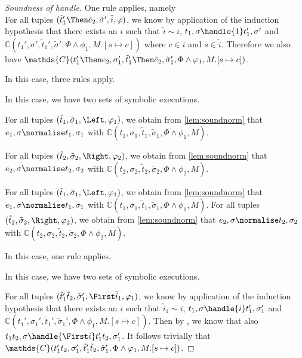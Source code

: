 \begin{proof}[Soundness of handle]
{One rule applies, namely \\
For all tuples $(\tilde{t}_1'\Then\tilde{e}_2,\tilde{\sigma}',\tilde{i},\phi)$, we know by application of the induction hypothesis that
there exists an $i$ such that $\tilde{i}\sim i$, $t_1,\sigma\handle{1}t_1',\sigma'$ and
$\mathds{C}(t_1',\sigma',\tilde{t}_1',\tilde{\sigma}',\Phi\land\phi_1,M.[s\mapsto c])$ where $c\in i$ and $s\in \tilde{i}$.
Therefore we also have $\mathds{C}(t_1'\Then e_2,\sigma_1',\tilde{t}_1'\Then \tilde{e}_2,\tilde{\sigma}_1',\Phi\land\phi_1,M.[s\mapsto c])$.
}

 {
In this case, three rules apply.\\
   {
   In this case, we have two sets of symbolic executions.

   For all tuples $(\tilde{t}_1,\tilde{\sigma}_1,\Left,\phi_1)$,
   we obtain from \cref{lem:soundnorm} that $e_1,\sigma\normalise t_1,\sigma_1$ with
   $\mathds{C}(t_1,\sigma_1,\tilde{t}_1,\tilde{\sigma}_1,\Phi\land\phi_1,M)$.

   For all tuples $(\tilde{t}_2,\tilde{\sigma}_2,\Right,\phi_2)$,
   we obtain from \cref{lem:soundnorm} that $e_2,\sigma\normalise t_2,\sigma_2$ with
   $\mathds{C}(t_2,\sigma_2,\tilde{t}_2,\tilde{\sigma}_2,\Phi\land\phi_2,M)$.
   }
%
  {
  For all tuples $(\tilde{t}_1,\tilde{\sigma}_1,\Left,\phi_1)$,
  we obtain from \cref{lem:soundnorm} that $e_1,\sigma\normalise t_1,\sigma_1$ with
  $\mathds{C}(t_1,\sigma_1,\tilde{t}_1,\tilde{\sigma}_1,\Phi\land\phi_1,M)$.
%
}
  {
  For all tuples $(\tilde{t}_2,\tilde{\sigma}_2,\Right,\phi_2)$,
  we obtain from \cref{lem:soundnorm} that $e_2,\sigma\normalise t_2,\sigma_2$ with
  $\mathds{C}(t_2,\sigma_2,\tilde{t}_2,\tilde{\sigma}_2,\Phi\land\phi_2,M)$.
  }
 }
%
{
In this case, one rule applies. 

In this case, we have two sets of symbolic executions.

  For all tuples $(\tilde{t}_1'\And\tilde{t}_2,\tilde{\sigma}_1',\First \tilde{i}_1,\phi_1)$,
  we know by application of the induction hypothesis that there exists an $i$ such that
  $\tilde{i}_1\sim i$, $t_1,\sigma\handle{i}t_1',\sigma_1'$ and
  $\mathds{C}(t_1',\sigma_1',\tilde{t}_1',\tilde{\sigma}_1',\Phi\land\phi_1,M.[s\mapsto c])$.
  Then by , we know that also $t_1\And t_2,\sigma\handle{\First i}t_1'\And t_2,\sigma_1'$.
  It follows trivially that $\mathds{C}(t_1'\And t_2,\sigma_1',\tilde{t}_1'\And \tilde{t}_2,\tilde{\sigma}_1',\Phi\land\phi_1,M.[s\mapsto c])$.

}
\end{proof}
